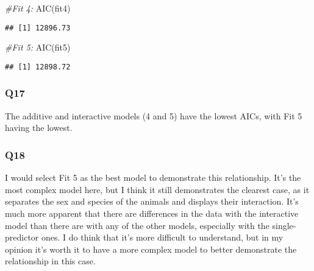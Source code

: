 \documentclass[
]{article}
\newenvironment{Shaded}{\begin{snugshade}}{\end{snugshade}}
\newcommand{\CommentTok}[1]{\textcolor[rgb]{0.56,0.35,0.01}{\textit{#1}}}
\newcommand{\FunctionTok}[1]{\textcolor[rgb]{0.00,0.00,0.00}{#1}}
\newcommand{\NormalTok}[1]{#1}
\begin{document}
\begin{Shaded}
\begin{Highlighting}[]
\CommentTok{\#Fit 4:}
\FunctionTok{AIC}\NormalTok{(fit4)}
\end{Highlighting}
\end{Shaded}

\begin{verbatim}
## [1] 12896.73
\end{verbatim}

\begin{Shaded}
\begin{Highlighting}[]
\CommentTok{\#Fit 5:}
\FunctionTok{AIC}\NormalTok{(fit5)}
\end{Highlighting}
\end{Shaded}

\begin{verbatim}
## [1] 12898.72
\end{verbatim}

\hypertarget{q17}{%
\subsubsection{Q17}\label{q17}}

The additive and interactive models (4 and 5) have the lowest AICs, with
Fit 5 having the lowest.

\hypertarget{q18}{%
\subsubsection{Q18}\label{q18}}

I would select Fit 5 as the best model to demonstrate this relationship.
It's the most complex model here, but I think it still demonstrates the
clearest case, as it separates the sex and species of the animals and
displays their interaction. It's much more apparent that there are
differences in the data with the interactive model than there are with
any of the other models, especially with the single-predictor ones. I do
think that it's more difficult to understand, but in my opinion it's
worth it to have a more complex model to better demonstrate the
relationship in this case.
\end{document}
